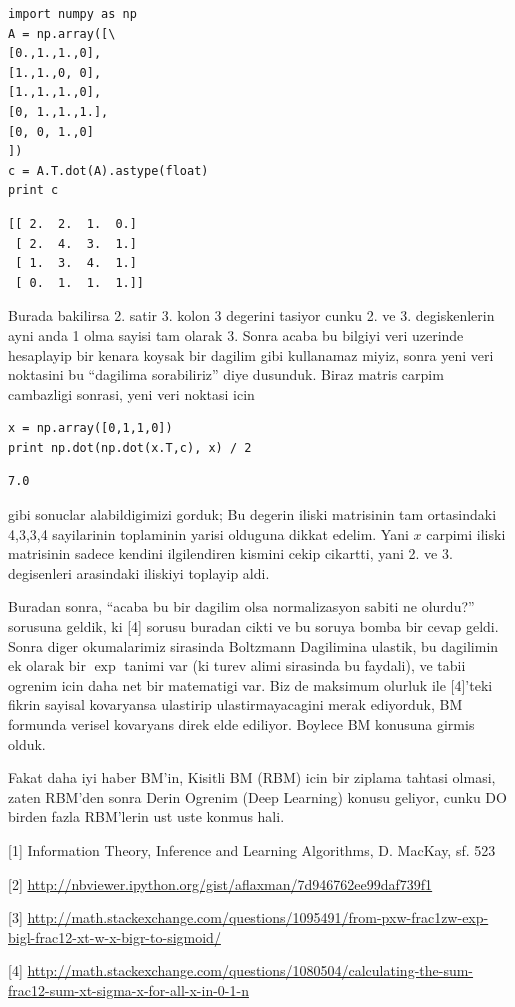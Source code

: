 \documentclass[12pt,fleqn]{article}\usepackage{../common}
\begin{document}
\begin{verbatim}
import numpy as np
A = np.array([\
[0.,1.,1.,0],
[1.,1.,0, 0],
[1.,1.,1.,0],
[0, 1.,1.,1.],
[0, 0, 1.,0]
])
c = A.T.dot(A).astype(float)
print c 
\end{verbatim}

\begin{verbatim}
[[ 2.  2.  1.  0.]
 [ 2.  4.  3.  1.]
 [ 1.  3.  4.  1.]
 [ 0.  1.  1.  1.]]
\end{verbatim}

Burada bakilirsa 2. satir 3. kolon 3 degerini tasiyor cunku 2. ve
3. degiskenlerin ayni anda 1 olma sayisi tam olarak 3. Sonra acaba bu
bilgiyi veri uzerinde hesaplayip bir kenara koysak bir dagilim gibi
kullanamaz miyiz, sonra yeni veri noktasini bu ``dagilima sorabiliriz''
diye dusunduk. Biraz matris carpim cambazligi sonrasi, yeni veri noktasi
icin

\begin{verbatim}
x = np.array([0,1,1,0])
print np.dot(np.dot(x.T,c), x) / 2
\end{verbatim}

\begin{verbatim}
7.0
\end{verbatim}

gibi sonuclar alabildigimizi gorduk; Bu degerin iliski matrisinin tam
ortasindaki 4,3,3,4 sayilarinin toplaminin yarisi olduguna dikkat
edelim. Yani $x$ carpimi iliski matrisinin sadece kendini ilgilendiren
kismini cekip cikartti, yani 2. ve 3. degisenleri arasindaki iliskiyi
toplayip aldi.

Buradan sonra, ``acaba bu bir dagilim olsa normalizasyon sabiti ne
olurdu?'' sorusuna geldik, ki [4] sorusu buradan cikti ve bu soruya bomba
bir cevap geldi. Sonra diger okumalarimiz sirasinda Boltzmann Dagilimina
ulastik, bu dagilimin ek olarak bir $\exp$ tanimi var (ki turev alimi
sirasinda bu faydali), ve tabii ogrenim icin daha net bir matematigi
var. Biz de maksimum olurluk ile [4]'teki fikrin sayisal kovaryansa
ulastirip ulastirmayacagini merak ediyorduk, BM formunda verisel kovaryans
direk elde ediliyor. Boylece BM konusuna girmis olduk. 

Fakat daha iyi haber BM'in, Kisitli BM (RBM) icin bir ziplama tahtasi
olmasi, zaten RBM'den sonra Derin Ogrenim (Deep Learning) konusu geliyor,
cunku DO birden fazla RBM'lerin ust uste konmus hali. 

[1] Information Theory, Inference and Learning Algorithms, D. MacKay, sf. 523

[2] \url{http://nbviewer.ipython.org/gist/aflaxman/7d946762ee99daf739f1}

[3] \url{http://math.stackexchange.com/questions/1095491/from-pxw-frac1zw-exp-bigl-frac12-xt-w-x-bigr-to-sigmoid/}

[4] \url{http://math.stackexchange.com/questions/1080504/calculating-the-sum-frac12-sum-xt-sigma-x-for-all-x-in-0-1-n}
\end{document}
